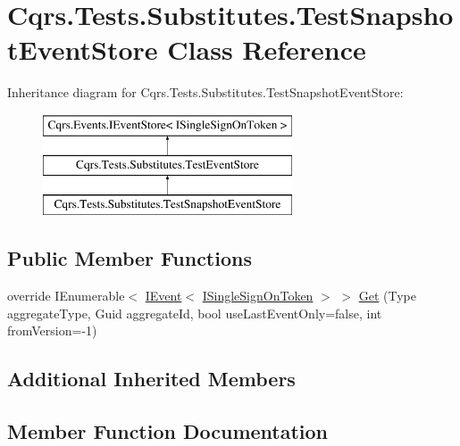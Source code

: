 \hypertarget{classCqrs_1_1Tests_1_1Substitutes_1_1TestSnapshotEventStore}{}\section{Cqrs.\+Tests.\+Substitutes.\+Test\+Snapshot\+Event\+Store Class Reference}
\label{classCqrs_1_1Tests_1_1Substitutes_1_1TestSnapshotEventStore}
Inheritance diagram for Cqrs.\+Tests.\+Substitutes.\+Test\+Snapshot\+Event\+Store\+:\begin{figure}[H]
\begin{center}
\leavevmode
\includegraphics[height=3.000000cm]{classCqrs_1_1Tests_1_1Substitutes_1_1TestSnapshotEventStore}
\end{center}
\end{figure}
\subsection*{Public Member Functions}
\begin{DoxyCompactItemize}
\item 
override I\+Enumerable$<$ \hyperlink{interfaceCqrs_1_1Events_1_1IEvent}{I\+Event}$<$ \hyperlink{interfaceCqrs_1_1Authentication_1_1ISingleSignOnToken}{I\+Single\+Sign\+On\+Token} $>$ $>$ \hyperlink{classCqrs_1_1Tests_1_1Substitutes_1_1TestSnapshotEventStore_a7acb01defa795be81fc14a19ae703970}{Get} (Type aggregate\+Type, Guid aggregate\+Id, bool use\+Last\+Event\+Only=false, int from\+Version=-\/1)
\end{DoxyCompactItemize}
\subsection*{Additional Inherited Members}


\subsection{Member Function Documentation}
\mbox{\label{classCqrs_1_1Tests_1_1Substitutes_1_1TestSnapshotEventStore_a7acb01defa795be81fc14a19ae703970}} 
